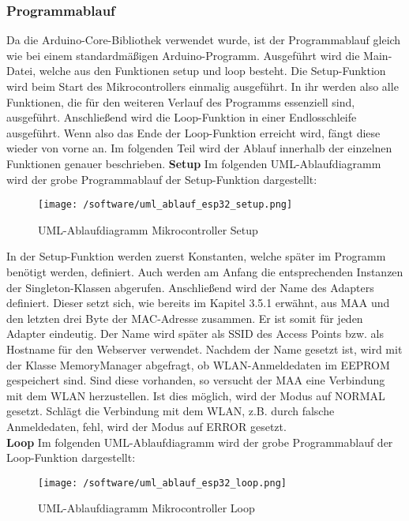 \documentclass[11pt, twoside]{article}
\begin{document}
\subsubsection{Programmablauf}
Da die \glqq Arduino-Core\grqq{}-Bibliothek verwendet wurde, ist der Programmablauf gleich wie bei einem standardmäßigen Arduino-Programm. Ausgeführt wird die Main-Datei, welche aus den Funktionen \glqq setup\grqq{} und \glqq loop\grqq{} besteht. Die Setup-Funktion wird beim Start des Mikrocontrollers einmalig ausgeführt. In ihr werden also alle Funktionen, die für den weiteren Verlauf des Programms essenziell sind, ausgeführt. Anschließend wird die Loop-Funktion in einer Endlosschleife ausgeführt. Wenn also das Ende der Loop-Funktion erreicht wird, fängt diese wieder von vorne an. Im folgenden Teil wird der Ablauf innerhalb der einzelnen Funktionen genauer beschrieben.
\vspace{4mm}\newline
\textbf{Setup} \newline
Im folgenden UML-Ablaufdiagramm wird der grobe Programmablauf der Setup-Funktion dargestellt:
\newpage
\begin{figure}[H]
	\texttt{[image: /software/uml\_ablauf\_esp32\_setup.png]}
	\caption{UML-Ablaufdiagramm Mikrocontroller Setup}
\end{figure}
\noindent In der Setup-Funktion werden zuerst Konstanten, welche später im Programm benötigt werden, definiert. Auch werden am Anfang die entsprechenden Instanzen der Singleton-Klassen abgerufen. Anschließend wird der Name des Adapters definiert. Dieser setzt sich, wie bereits im Kapitel 3.5.1 erwähnt, aus \glqq MAA\grqq{} und den letzten drei Byte der MAC-Adresse zusammen. Er ist somit für jeden Adapter eindeutig. Der Name wird später als SSID des Access Points bzw. als Hostname für den Webserver verwendet. Nachdem der Name gesetzt ist, wird mit der Klasse \glqq MemoryManager\grqq{} abgefragt, ob WLAN-Anmeldedaten im EEPROM gespeichert sind. Sind diese vorhanden, so versucht der MAA eine Verbindung mit dem WLAN herzustellen. Ist dies möglich, wird der Modus auf \glqq NORMAL\grqq{} gesetzt. Schlägt die Verbindung mit dem WLAN, z.B. durch falsche Anmeldedaten, fehl, wird der Modus auf \glqq ERROR\grqq{} gesetzt. \newline \\
\textbf{Loop} \newline
Im folgenden UML-Ablaufdiagramm wird der grobe Programmablauf der Loop-Funktion dargestellt:
\newpage
\begin{figure}[H]
	\texttt{[image: /software/uml\_ablauf\_esp32\_loop.png]}
	\caption{UML-Ablaufdiagramm Mikrocontroller Loop}
\end{figure}
\end{document}
